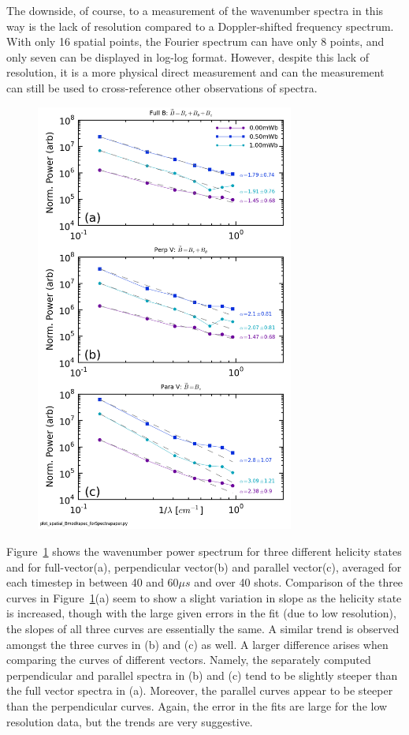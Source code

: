 \documentclass[aip,prl,amsmath,amssymb,reprint,superscriptaddress]{revtex4-1} %
\begin{document}
The downside, of course, to a measurement of the wavenumber spectra in this way is the lack of resolution compared to a Doppler-shifted frequency spectrum. With only 16 spatial points, the Fourier spectrum can have only 8 points, and only seven can be displayed in log-log format. However, despite this lack of resolution, it is a more physical direct measurement and can the measurement can still be used to cross-reference other observations of spectra.

\begin{figure}[!htbp]
\centerline{
\includegraphics[width=8.5cm]{Bmod_FFTwavenumberspectra_wFits_40t60us}}
\caption{\label{fig:wavenumber_spectra}}
\end{figure}

Figure~\ref{fig:wavenumber_spectra} shows the wavenumber power spectrum for three different helicity states and for full-vector(a), perpendicular vector(b) and parallel vector(c), averaged for each timestep in between 40 and 60$\mu s$ and over 40 shots. Comparison of the three curves in Figure~\ref{fig:wavenumber_spectra}(a) seem to show a slight variation in slope as the helicity state is increased, though with the large given errors in the fit (due to low resolution), the slopes of all three curves are essentially the same. A similar trend is observed amongst the three curves in (b) and (c) as well. A larger difference arises when comparing the curves of different vectors. Namely, the separately computed perpendicular and parallel spectra in (b) and (c) tend to be slightly steeper than the full vector spectra in (a). Moreover, the parallel curves appear to be steeper than the perpendicular curves. Again, the error in the fits are large for the low resolution data, but the trends are very suggestive.
\end{document}
